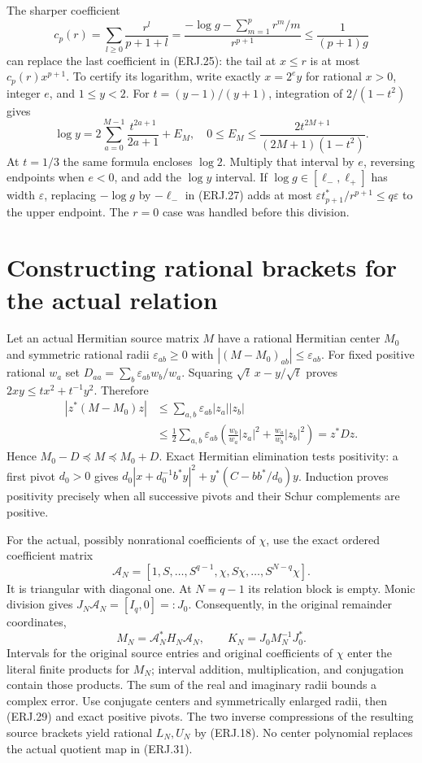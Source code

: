 \documentclass[11pt]{article}
\begin{document}
The sharper coefficient
\[
 c_p(r)=\sum_{l\ge0}\frac{r^l}{p+1+l}
 =\frac{-\log g-\sum_{m=1}^pr^m/m}{r^{p+1}}
 \le\frac1{(p+1)g}\tag{ERJ.27}
\]
can replace the last coefficient in (ERJ.25): the tail at $x\le r$
is at most $c_p(r)x^{p+1}$. To certify its logarithm, write exactly
$x=2^e y$ for rational $x>0$, integer $e$, and $1\le y<2$.
For $t=(y-1)/(y+1)$, integration of $2/(1-t^2)$ gives
\[
 \log y=2\sum_{a=0}^{M-1}\frac{t^{2a+1}}{2a+1}+E_M,
 \quad0\le E_M\le
 \frac{2t^{2M+1}}{(2M+1)(1-t^2)}.\tag{ERJ.28}
\]
At $t=1/3$ the same formula encloses $\log2$. Multiply that
interval by $e$, reversing endpoints when $e<0$, and add the
$\log y$ interval. If $\log g\in[\ell_-,\ell_+]$ has width
$\varepsilon$, replacing $-\log g$ by $-\ell_-$ in (ERJ.27)
adds at most $\varepsilon t_{p+1}^*/r^{p+1}\le q\varepsilon$
to the upper endpoint. The $r=0$ case was handled before this division.

\section{Constructing rational brackets for the actual relation}
Let an actual Hermitian source matrix $M$ have a rational Hermitian
center $M_0$ and symmetric rational radii $\varepsilon_{ab}\ge0$
with $|(M-M_0)_{ab}|\le\varepsilon_{ab}$. For fixed positive
rational $w_a$ set $D_{aa}=\sum_b\varepsilon_{ab}w_b/w_a$.
Squaring $\sqrt t\,x-y/\sqrt t$ proves
$2xy\le tx^2+t^{-1}y^2$. Therefore
\[
\begin{split}
 |z^*(M-M_0)z|&\le\sum_{a,b}\varepsilon_{ab}|z_a||z_b|\\
 &\le\frac12\sum_{a,b}\varepsilon_{ab}
 \left(\frac{w_b}{w_a}|z_a|^2+\frac{w_a}{w_b}|z_b|^2\right)
 =z^*Dz.
\end{split}\tag{ERJ.29}
\]
Hence $M_0-D\preceq M\preceq M_0+D$. Exact Hermitian elimination
tests positivity: a first pivot $d_0>0$ gives
$d_0|x+d_0^{-1}b^*y|^2+y^*(C-bb^*/d_0)y$.
Induction proves positivity precisely when all successive pivots
and their Schur complements are positive.

For the actual, possibly nonrational coefficients of $\chi$, use the
exact ordered coefficient matrix
\[
 \mathcal A_N=[1,S,\ldots,S^{q-1},\chi,S\chi,\ldots,S^{N-q}\chi].
 \tag{ERJ.30}
\]
It is triangular with diagonal one. At $N=q-1$ its relation block
is empty. Monic division gives $J_N\mathcal A_N=[I_q,0]=:J_0$.
Consequently, in the original remainder coordinates,
\[
 M_N=\mathcal A_N^*H_N\mathcal A_N,\qquad
 K_N=J_0M_N^{-1}J_0^*.\tag{ERJ.31}
\]
Intervals for the original source entries and original coefficients
of $\chi$ enter the literal finite products for $M_N$; interval
addition, multiplication, and conjugation contain those products.
The sum of the real and imaginary radii bounds a complex error.
Use conjugate centers and symmetrically enlarged radii, then (ERJ.29)
and exact positive pivots. The two inverse compressions of the
resulting source brackets yield rational $L_N,U_N$ by (ERJ.18).
No center polynomial replaces the actual quotient map in (ERJ.31).
\end{document}
